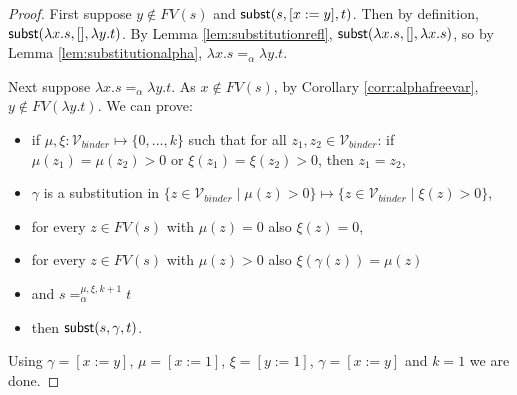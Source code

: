 \documentclass{lmcs}
\theoremstyle{theorem}\newtheorem{theorem}{Theorem}
\theoremstyle{theorem}\newtheorem{lemma}[theorem]{Lemma}
\theoremstyle{theorem}\newtheorem{corollary}[theorem]{Corollary}
\theoremstyle{definition}\newtheorem{definition}[theorem]{Definition}
\theoremstyle{definition}\newtheorem{example}[theorem]{Example}
\newcommand{\Vbound}{\mathcal{V}_{\mathit{binder}}}
\newcommand{\FV}{\mathit{FV}}
\newcommand{\avar}{x}
\newcommand{\bvar}{y}
\newcommand{\cvar}{z}
\newcommand{\abs}[2]{\lambda #1.#2}
\begin{document}
\begin{proof}
First suppose $\bvar \notin \FV(s)$ and $\subrel{s,[\avar:=\bvar],t}$.  Then by definition,
$\subrel{\abs{\avar}{s}, [], \abs{\bvar}{t}}$.
By Lemma \ref{lem:substitutionrefl}, $\subrel{\abs{\avar}{s}, [], \abs{\avar}{s}}$, so
by Lemma \ref{lem:substitutionalpha}, $\abs{\avar}{s} =_\alpha \abs{\bvar}{t}$.

Next suppose $\abs{\avar}{s} =_\alpha \abs{\bvar}{t}$.  As $\avar \notin \FV(s)$, by Corollary
\ref{corr:alphafreevar}, $\bvar \notin \FV(\abs{\bvar}{t})$.
We can prove:
\begin{itemize}
\item if $\mu,\xi : \Vbound \mapsto \{0,\dots,k\}$ such that for all $\cvar_1,\cvar_2 \in
  \Vbound$: if $\mu(\cvar_1) = \mu(\cvar_2) > 0$ or $\xi(\cvar_1) = \xi(\cvar_2) > 0$, then
  $\cvar_1 = \cvar_2$,
\item $\gamma$ is a substitution in $\{ \cvar \in \Vbound \mid \mu(\cvar) > 0 \} \mapsto \{ \cvar \in \Vbound \mid \xi(\cvar) > 0 \}$,
\item for every $\cvar \in \FV(s)$ with $\mu(\cvar) = 0$ also $\xi(\cvar) = 0$,
\item for every $\cvar \in \FV(s)$ with $\mu(\cvar) > 0$ also $\xi(\gamma(\cvar)) = \mu(\cvar)$
\item and $s =_\alpha^{\mu,\xi,k+1} t$
\item then $\mathsf{subst}(s,\gamma,t)$.
\end{itemize}
Using $\gamma = [\avar:=\bvar]$, $\mu = [\avar:=1]$, $\xi = [\bvar:=1]$, $\gamma = [\avar:=\bvar]$ and $k = 1$ we are done.


\end{proof}
\end{document}
